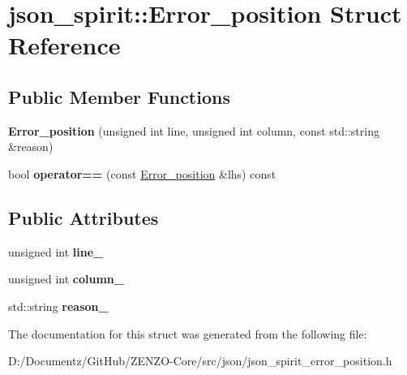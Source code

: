 \hypertarget{structjson__spirit_1_1_error__position}{}\section{json\+\_\+spirit\+::Error\+\_\+position Struct Reference}
\label{structjson__spirit_1_1_error__position}
\subsection*{Public Member Functions}
\begin{DoxyCompactItemize}
\item 
\mbox{\label{structjson__spirit_1_1_error__position_aaba601f740e35d100d50865b51f4cb25}} 
{\bfseries Error\+\_\+position} (unsigned int line, unsigned int column, const std\+::string \&reason)
\item 
\mbox{\label{structjson__spirit_1_1_error__position_a5e13485acfa217c61c6dd8691007c9ec}} 
bool {\bfseries operator==} (const \mbox{\hyperlink{structjson__spirit_1_1_error__position}{Error\+\_\+position}} \&lhs) const
\end{DoxyCompactItemize}
\subsection*{Public Attributes}
\begin{DoxyCompactItemize}
\item 
\mbox{\label{structjson__spirit_1_1_error__position_abab231b427a34db24a70da8b552e57f1}} 
unsigned int {\bfseries line\+\_\+}
\item 
\mbox{\label{structjson__spirit_1_1_error__position_a4d91168f6a7de23c3bf3c0cd7c0f2d1f}} 
unsigned int {\bfseries column\+\_\+}
\item 
\mbox{\label{structjson__spirit_1_1_error__position_a3012abfa6a31d6fe57a3699093361fc2}} 
std\+::string {\bfseries reason\+\_\+}
\end{DoxyCompactItemize}


The documentation for this struct was generated from the following file\+:\begin{DoxyCompactItemize}
\item 
D\+:/\+Documentz/\+Git\+Hub/\+Z\+E\+N\+Z\+O-\/\+Core/src/json/json\+\_\+spirit\+\_\+error\+\_\+position.\+h\end{DoxyCompactItemize}
